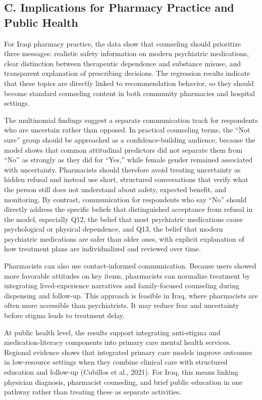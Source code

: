 \subsection{C. Implications for Pharmacy Practice and Public
Health}\label{c.-implications-for-pharmacy-practice-and-public-health}

For Iraqi pharmacy practice, the data show that counseling should
prioritize three messages: realistic safety information on modern
psychiatric medications, clear distinction between therapeutic
dependence and substance misuse, and transparent explanation of
prescribing decisions. The regression results indicate that these topics
are directly linked to recommendation behavior, so they should become
standard counseling content in both community pharmacies and hospital
settings.

The multinomial findings suggest a separate communication track for
respondents who are uncertain rather than opposed. In practical
counseling terms, the ``Not sure'' group should be approached as a
confidence-building audience, because the model shows that common
attitudinal predictors did not separate them from ``No'' as strongly as
they did for ``Yes,'' while female gender remained associated with
uncertainty. Pharmacists should therefore avoid treating uncertainty as
hidden refusal and instead use short, structured conversations that
verify what the person still does not understand about safety, expected
benefit, and monitoring. By contrast, communication for respondents who
say ``No'' should directly address the specific beliefs that
distinguished acceptance from refusal in the model, especially Q12, the
belief that most psychiatric medications cause psychological or physical
dependence, and Q13, the belief that modern psychiatric medications are
safer than older ones, with explicit explanation of how treatment plans
are individualized and reviewed over time.

Pharmacists can also use contact-informed communication. Because users
showed more favorable attitudes on key items, pharmacists can normalize
treatment by integrating lived-experience narratives and family-focused
counseling during dispensing and follow-up. This approach is feasible in
Iraq, where pharmacists are often more accessible than psychiatrists. It
may reduce fear and uncertainty before stigma leads to treatment delay.

At public health level, the results support integrating anti-stigma and
medication-literacy components into primary care mental health services.
Regional evidence shows that integrated primary care models improve
outcomes in low-resource settings when they combine clinical care with
structured education and follow-up (Cubillos et al., 2021). For Iraq,
this means linking physician diagnosis, pharmacist counseling, and brief
public education in one pathway rather than treating these as separate
activities.

